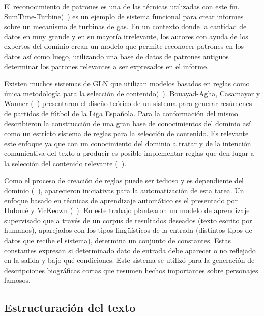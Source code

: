     El reconocimiento de patrones es una de las t\'ecnicas utilizadas con este fin.  SumTime-Turbine(~\cite{Yu2006ChoosingTC}) es un ejemplo de sistema funcional para crear
 informes sobre un mecanismo de turbinas de gas. En un contexto donde la cantidad de datos en muy grande y en su mayoría irrelevante, 
 los autores con ayuda de los expertos del dominio crean un modelo que permite reconocer patrones en los datos así como luego, utilizando una base de datos de patrones 
antiguos determinar los patrones relevantes a ser expresados en el informe. 

    Existen muchos sistemas de GLN que utilizan modelos basados en reglas como \'unica metodolog\'ia para la selecci\'on de contenido(~\cite{reiter_dale_2000,Perera2017RecentAI}). Bouayad-Agha, Casamayor y 
Wanner (~\cite{BouayadAgha2011ContentSF}) presentaron el dise\~no te\'orico de un sistema para generar resúmenes de partidos de 
fútbol de la Liga Espa\~nola. Para la conformaci\'on del mismo describieron la construcci\'on de una gran base de conocimientos del dominio as\'i como 
un estricto sistema de reglas para la selecci\'on de contenido. Es relevante este enfoque ya que con un conocimiento del dominio a tratar y de la intenci\'on comunicativa del texto a producir 
es posible implementar reglas que den lugar a la selección del contenido relevante (~\cite{Reiter1997BuildingAN,reiter_dale_2000}). 

    Como el proceso de creaci\'on de reglas puede ser tedioso y es dependiente del dominio (~\cite{Reiter1997BuildingAN}), aparecieron iniciativas para la automatizaci\'on de esta tarea. Un enfoque 
basado en t\'ecnicas de aprendizaje autom\'atico es el presentado por Dubou\'e y McKeown (~\cite{Dubou2003StatisticalAO}). En este trabajo plantearon un modelo de aprendizaje supervisado que a trav\'es de
un corpus de resultados deseados (texto escrito por humanos), aparejados con los tipos lingüísticos de la entrada (distintos tipos de datos que recibe el sistema), determina un conjunto de constantes. Estas constantes 
expresan si determinado dato de entrada debe aparecer o no reflejado en la salida y bajo qué condiciones. Este sistema se utilizó para la generación de descripciones biográficas cortas que resumen hechos 
importantes sobre personajes famosos.

\subsection{Estructuración del texto}\label{subsection:estructuracion}

